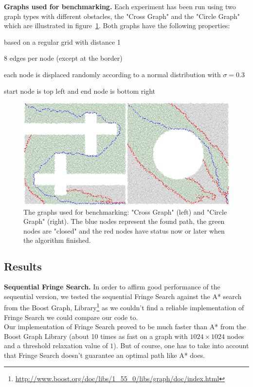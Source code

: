 \documentclass[letterpaper]{article}
\newcommand{\mypar}[1]{{\bf #1.}}
\begin{document}
\mypar{Graphs used for benchmarking}
Each experiment has been run using two graph types with different obstacles, the "Cross Graph" and the "Circle Graph" which are illustrated in figure~\ref{fig:graphs}. Both graphs have the following properties:
\begin{compactitem}
\item based on a regular grid with distance 1
\item 8 edges per node (except at the border)
\item each node is displaced randomly according to a normal distribution with $\sigma = 0.3$
\item start node is top left and end node is bottom right
\end{compactitem}

\begin{figure}[h]\centering
  \includegraphics[scale=0.3]{benchmark_graphs.eps}
  \caption{The graphs used for benchmarking: "Cross Graph" (left) and "Circle Graph" (right). The blue nodes represent the found path, the green nodes are "closed" and the red nodes have status now or later when the algorithm finished. \label{fig:graphs}}
\end{figure}

\subsection{Results}\label{ssec:results}

\mypar{Sequential Fringe Search}
In order to affirm good performance of the sequential version, we tested the sequential Fringe Search against the A* search from the Boost Graph, Library\footnote{\url{http://www.boost.org/doc/libs/1_55_0/libs/graph/doc/index.html}} as we couldn't find a reliable implementation of Fringe Search we could compare our code to.\\
Our implementation of Fringe Search proved to be much faster than A* from the Boost Graph Library (about 10 times as fast on a graph with $1024 \times 1024$ nodes and a threshold relaxation value of $1$). But of course, one has to take into account that Fringe Search doesn't guarantee an optimal path like A* does.
\end{document}

